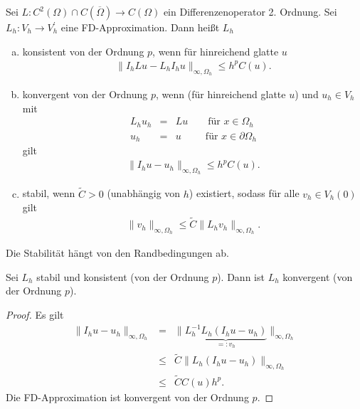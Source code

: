 \begin{Definition}
    \label{def:2.5}
    Sei $L \colon C^2(\Omega) \cap C(\overline\Omega) \to C(\Omega)$ ein
    Differenzenoperator 2. Ordnung. Sei $L_h \colon V_h \rightarrow V_h^{'}$ eine
    FD-Approximation. Dann heißt $L_h$
    \begin{enumerate}[a)]
	\item
	    konsistent von der Ordnung $p$, wenn für hinreichend glatte
	    $u$
	    \begin{eqnarray*}
            \|I_h L u -L_h I_h u\|_{\infty, \Omega_h} \le h^p C(u).
	    \end{eqnarray*}
	\item
	    konvergent von der Ordnung $p$, wenn (für hinreichend glatte
	    $u$) und $u_h \in V_h$ mit
	    \begin{eqnarray*}
            L_h u_h &=& L u \qquad \text{für } x \in \Omega_h \\
            u_h &=& u \ \ \qquad \text{für } x \in \partial \Omega_h
	    \end{eqnarray*}
	    gilt
	    \begin{eqnarray*}
            \|I_h u - u_h\|_{\infty, \Omega_h} \le h^p C(u).
	    \end{eqnarray*}
	\item
	    stabil, wenn $\tilde C > 0$ (unabhängig von $h$) existiert,
	    sodass für alle $v_h \in V_h(0)$ gilt
	    \begin{eqnarray*}
                \|v_h\|_{\infty, \Omega_h}
            \le \tilde C \|L_h v_h\|_{\infty, \Omega_h}.     
	    \end{eqnarray*}
    \end{enumerate} 
\end{Definition}


\begin{Bemerkung}
    Die Stabilität hängt von den Randbedingungen ab.
\end{Bemerkung}


\begin{Satz}
    \label{satz:2.6}
    Sei $L_h$ stabil und konsistent (von der Ordnung $p$). Dann ist $L_h$
    konvergent (von der Ordnung $p$).
\end{Satz}


\begin{proof}
    Es gilt
    \begin{eqnarray*}
            \|I_h u - u_h\|_{\infty, \Omega_h}
        &=& \|\underbrace{L_h^{-1} L_h (I_h u - u_h)}_{= \colon v_h}\|
            _{\infty, \Omega_h} \\
        &\le& \tilde C \|L_h (I_h u - u_h)\|_{\infty, \Omega_h} \\
        &\le& \tilde C C(u) h^p.
    \end{eqnarray*}
    Die FD-Approximation ist konvergent von der Ordnung $p$.
\end{proof}


